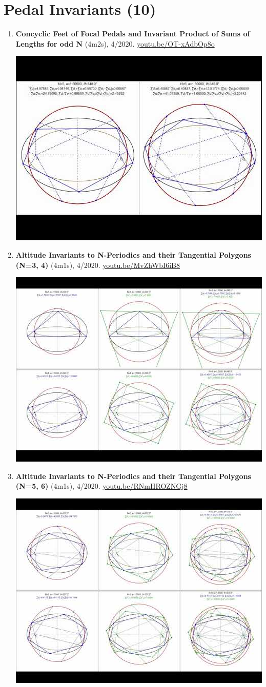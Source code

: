 \documentclass[12pt]{article}
\begin{document}
\section{Pedal Invariants (10)}

\begin{enumerate}[resume]
\item \textbf{Concyclic Feet of Focal Pedals and Invariant Product of Sums of Lengths for odd N} (4m2s), 4/2020. \href{https://youtu.be/OT-xAdbOp8o}{\url{youtu.be/OT-xAdbOp8o}}
\begin{center}\includegraphics[width=.5\textwidth]{pics/OT-xAdbOp8o.jpg}\end{center}
% 
\item \textbf{Altitude Invariants to N-Periodics and their Tangential Polygons (N=3, 4)} (4m1s), 4/2020. \href{https://youtu.be/MvZhWbI6iB8}{\url{youtu.be/MvZhWbI6iB8}}
\begin{center}\includegraphics[width=.5\textwidth]{pics/MvZhWbI6iB8.jpg}\end{center}
% 
\item \textbf{Altitude Invariants to N-Periodics and their Tangential Polygons (N=5, 6)} (4m1s), 4/2020. \href{https://youtu.be/RNmHROZNGj8}{\url{youtu.be/RNmHROZNGj8}}
\begin{center}\includegraphics[width=.5\textwidth]{pics/RNmHROZNGj8.jpg}\end{center}

\end{enumerate}
\end{document}
